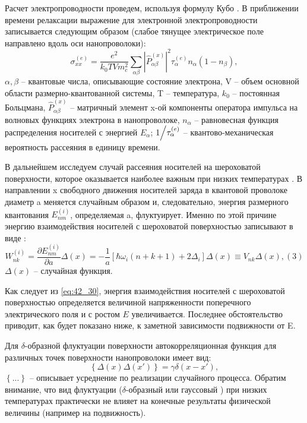 Расчет электропроводности проведем, используя формулу Кубо \cite{Kubo1957a}. В приближении времени релаксации \cite{Khamidullin2002} выражение для электронной электропроводности записывается следующим образом (слабое тянущее электрическое поле направлено вдоль оси нанопроволоки):
\begin{equation} \label{eq:42_20}
\sigma _{xx}^{(e)} =\frac{e^{2} }{k_{0} TVm_{c}^{2} } \sum _{\alpha \beta }\left|\hat{P}_{\alpha \beta }^{(x)} \right|^{2} \tau _{\alpha }^{(e)} n_{\alpha } \left(1-n_{\beta } \right),
\end{equation} 
$\alpha ,\beta $ -- квантовые числа, описывающие состояние электрона, V -- объем основной области размерно-квантованной системы, T -- температура, $k_{0} $ -- постоянная Больцмана, $\hat{P}_{\alpha \beta }^{(x)} $ -- матричный элемент x-ой компоненты оператора импульса на волновых функциях электрона в нанопроволоке, $n_{\alpha } $ -- равновесная функция распределения носителей с энергией $E_{\alpha } $; ${1 \mathord{\left/{\vphantom{1 \tau _{\alpha }^{(e)} }}\right.\kern-\nulldelimiterspace} \tau _{\alpha }^{(e)} } $ -- квантово-механическая вероятность рассеяния в единицу времени.

В дальнейшем исследуем случай рассеяния носителей на шероховатой поверхности, которое оказывается наиболее важным при низких температурах \cite{Sakaki1987,Vurgaftman1999}. В направлении x свободного движения носителей заряда в квантовой проволоке диаметр a меняется случайным образом и, следовательно, энергия размерного квантования $E_{nm}^{(i)} $, определяемая a, флуктуирует. Именно по этой причине энергию взаимодействия носителей с шероховатой поверхностью записывают в виде \cite{Sakaki1987}:
\begin{equation} \label{eq:42_30}
W_{nk}^{(i)} =\frac{\partial E_{nm}^{(i)} }{\partial a} \Delta (x)=-\frac{1}{a} \left[\hbar \omega _{i} \left(n+k+1\right)+2\Delta _{i} \right]\Delta (x)\equiv V_{nk} \Delta (x),  (3)
\end{equation}  
$\Delta (x)$ -- случайная функция.

Как следует из \eqref{eq:42_30}, энергия взаимодействия носителей с шероховатой поверхностью определяется величиной напряженности поперечного электрического поля и с ростом $E$ увеличивается. Последнее обстоятельство приводит, как будет показано ниже, к заметной зависимости подвижности от E.

Для $\delta $-образной флуктуации поверхности автокорреляционная функция для различных точек поверхности нанопроволоки имеет вид:
\begin{equation} \label{eq:42_40}
\left\{\Delta (x)\Delta (x')\right\}=\gamma \delta (x-x'),
\end{equation} 
$\left\{...\right\}$ -- описывает усреднение по реализации случайного процесса. Обратим внимание, что вид флуктуации ($\delta $-образный или гауссовый \cite{Sakaki1987}) при низких температурах практически не влияет на конечные результаты физической величины (например на подвижность).

